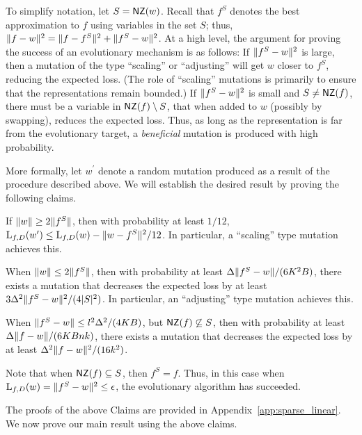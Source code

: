 To simplify notation, let $S = \mathsf{NZ}(w)$. Recall that $f^S$ denotes the best
approximation to $f$ using variables in the set $S$; thus, $\Vert f - w \Vert^2 =
\Vert f - f^S \Vert^2 + \Vert f^S - w \Vert^2$. At a high level, the argument for
proving the success of an evolutionary mechanism is as follows: If
$\Vert f^S - w \Vert^2$ is large, then a mutation of the type ``scaling'' or
``adjusting'' will get $w$ closer to $f^S$, reducing the expected loss. (The
role of ``scaling'' mutations is primarily to ensure that the representations
remain bounded.) If $\Vert f^S - w \Vert^2$ is small and $S \neq \mathsf{NZ}(f)$, there
must be a variable in $\mathsf{NZ}(f) \setminus S$, that when added to $w$ (possibly by
swapping), reduces the expected loss. Thus, as long as the representation is far
from the evolutionary target, a \emph{beneficial} mutation is produced with high
probability.

More formally, let $w^\prime$ denote a random mutation produced as a result of
the procedure described above.  We will establish the desired result by proving
the following claims.
\begin{claim} \label{claim:apple} If $\Vert w \Vert \geq 2 \Vert f^S \Vert$, then
with probability at least $1/12$, $\mathrm{L}_{f, D}(w^\prime) \leq \mathrm{L}_{f, D}(w) -
\Vert w - f^S \Vert^2/12$. In particular, a ``scaling'' type mutation achieves
this. \end{claim}
\begin{claim} \label{claim:banana} When $\Vert w \Vert \leq 2 \Vert f^S \Vert$,
then with probability at least $\Delta \Vert f^S - w \Vert/(6K^2 B)$, there
exists a mutation that decreases the expected loss by at least $3
\Delta^2\Vert f^S - w \Vert^2/(4|S|^2)$. In particular, an ``adjusting'' type
mutation achieves this. \end{claim}
\begin{claim} \label{claim:cantaloupe} When $\Vert f^S - w \Vert \leq
l^2\Delta^2/(4KB)$, but $\mathsf{NZ}(f) \not\subseteq S$, then with probability
at least $\Delta \Vert f - w \Vert/(6KBnk)$, there exists a mutation that
decreases the expected loss by at least $\Delta^2 \Vert f-w \Vert^2/(16k^2)$.
\end{claim}

\noindent Note that when $\mathsf{NZ}(f) \subseteq S$, then $f^S = f$. Thus, in this case
when $\mathrm{L}_{f, D}(w) = \Vert f^S - w \Vert^2 \leq \epsilon$, the evolutionary
algorithm has succeeded. \medskip 

The proofs of the above Claims are provided in
Appendix~\ref{app:sparse_linear}. We now prove our main result using the
above claims.

